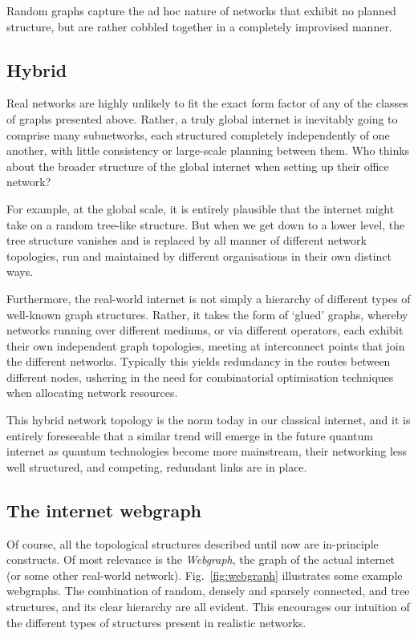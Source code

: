 \documentclass[aps,rmp,twocolumn,amsmath,amssymb,nofootinbib,superscriptaddress,longbibliography,floatfix,table-of-contents,eqsecnum]{revtex4-1}
\begin{document}
Random graphs capture the ad hoc nature of networks that exhibit no planned structure, but are rather cobbled together in a completely improvised manner.

%
%

\subsection{Hybrid} 

Real networks are highly unlikely to fit the exact form factor of any of the classes of graphs presented above. Rather, a truly global internet is inevitably going to comprise many subnetworks, each structured completely independently of one another, with little consistency or large-scale planning between them. Who thinks about the broader structure of the global internet when setting up their office network?

For example, at the global scale, it is entirely plausible that the internet might take on a random tree-like structure. But when we get down to a lower level, the tree structure vanishes and is replaced by all manner of different network topologies, run and maintained by different organisations in their own distinct ways.

Furthermore, the real-world internet is not simply a hierarchy of different types of well-known graph structures. Rather, it takes the form of `glued' graphs, whereby networks running over different mediums, or via different operators, each exhibit their own independent graph topologies, meeting at interconnect points that join the different networks. Typically this yields redundancy in the routes between different nodes, ushering in the need for combinatorial optimisation techniques when allocating network resources.

This hybrid network topology is the norm today in our classical internet, and it is entirely foreseeable that a similar trend will emerge in the future quantum internet as quantum technologies become more mainstream, their networking less well structured, and competing, redundant links are in place.

%
%

\subsection{The internet webgraph} 

Of course, all the topological structures described until now are in-principle constructs. Of most relevance is the \textit{Webgraph}, the graph of the actual internet (or some other real-world network). Fig.~\ref{fig:webgraph} illustrates some example webgraphs. The combination of random, densely and sparsely connected, and tree structures, and its clear hierarchy are all evident. This encourages our intuition of the different types of structures present in realistic networks.
\end{document}
